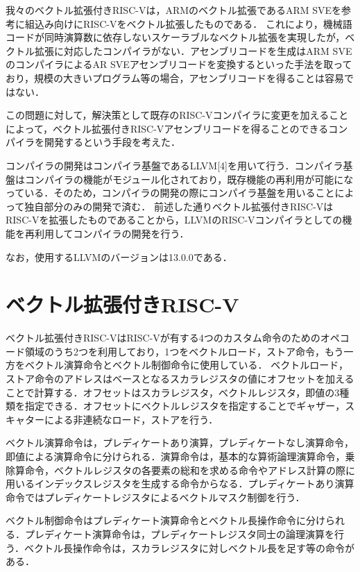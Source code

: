 \documentclass[a4paper,9pt, twocolumn]{jarticle}
\begin{document}
我々のベクトル拡張付きRISC-Vは，ARMのベクトル拡張であるARM SVE\cite{bib:arm_sve}を参考に組込み向けにRISC-V\cite{bib:risc-v}をベクトル拡張したものである．
これにより，機械語コードが同時演算数に依存しないスケーラブルなベクトル拡張を実現したが，ベクトル拡張に対応したコンパイラがない．アセンブリコードを生成はARM SVEのコンパイラによるAR SVEアセンブリコードを変換するといった手法を取っており，規模の大きいプログラム等の場合，アセンブリコードを得ることは容易ではない．

この問題に対して，解決策として既存のRISC-Vコンパイラに変更を加えることによって，ベクトル拡張付きRISC-Vアセンブリコードを得ることのできるコンパイラを開発するという手段を考えた．

コンパイラの開発はコンパイラ基盤であるLLVM[4]を用いて行う．コンパイラ基盤はコンパイラの機能がモジュール化されており，既存機能の再利用が可能になっている．そのため，コンパイラの開発の際にコンパイラ基盤を用いることによって独自部分のみの開発で済む．
前述した通りベクトル拡張付きRISC-VはRISC-Vを拡張したものであることから，LLVMのRISC-Vコンパイラとしての機能を再利用してコンパイラの開発を行う．

なお，使用するLLVMのバージョンは13.0.0である．

\section{ベクトル拡張付きRISC-V}

ベクトル拡張付きRISC-VはRISC-Vが有する4つのカスタム命令のためのオペコード領域のうち2つを利用しており，1つをベクトルロード，ストア命令，もう一方をベクトル演算命令とベクトル制御命令に使用している．
ベクトルロード，ストア命令のアドレスはベースとなるスカラレジスタの値にオフセットを加えることで計算する．オフセットはスカラレジスタ，ベクトルレジスタ，即値の3種類を指定できる．オフセットにベクトルレジスタを指定することでギャザー，スキャターによる非連続なロード，ストアを行う．

ベクトル演算命令は，プレディケートあり演算，プレディケートなし演算命令，即値による演算命令に分けられる．演算命令は，基本的な算術論理演算命令，乗除算命令，ベクトルレジスタの各要素の総和を求める命令やアドレス計算の際に用いるインデックスレジスタを生成する命令からなる．プレディケートあり演算命令ではプレディケートレジスタによるベクトルマスク制御を行う．

ベクトル制御命令はプレディケート演算命令とベクトル長操作命令に分けられる．プレディケート演算命令は，プレディケートレジスタ同士の論理演算を行う．ベクトル長操作命令は，スカラレジスタに対しベクトル長を足す等の命令がある．
\end{document}
